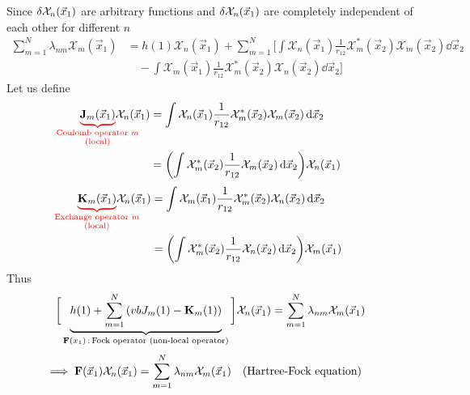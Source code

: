 \documentclass[12pt,a4paper,titlepage]{article}
\newcommand{\trm}[1]{\textrm{#1}} %
\newcommand{\Chi}{\mathcal{X}} %
\begin{document}
Since $\var{\Chi_{n}(\vec{x}_{1})}$ are arbitrary functions and $\var{\Chi_{n}(\vec{x}_{1})}$ are completely independent of each other for different $n$
\begin{equation}
\begin{aligned}
\sum_{m=1}^{N}\lambda_{nm}\Chi_{m}(\vec{x}_{1})&=h(1)\Chi_{n}(\vec{x}_{1})+\sum_{m=1}^{N}\bigg[\int\Chi_{n}(\vec{x}_{1})\frac{1}{r_{12}}\Chi_{m}^{*}(\vec{x}_{2})\Chi_{m}(\vec{x}_{2})\dd{\vec{x}_{2}}\\
&\quad-\int\Chi_{m}(\vec{x}_{1})\frac{1}{r_{12}}\Chi_{m}^{*}(\vec{x}_{2})\Chi_{n}(\vec{x}_{2})\dd{\vec{x}_{2}}\bigg]
\end{aligned}
\end{equation}
Let us define
\begin{equation}
\begin{aligned}
{\color{red}\underbrace{\color{black}\vb{J}_{m}(\vec{x}_{1})}_{\mathclap{\substack{\trm{Coulomb operator $m$}\\\trm{(local)}}}}}\Chi_{n}(\vec{x}_{1})&=\int\Chi_{n}(\vec{x}_{1})\frac{1}{r_{12}}\Chi_{m}^{*}(\vec{x}_{2})\Chi_{m}(\vec{x}_{2})\dd{\vec{x}_{2}}\\
&=\qty(\int\Chi_{m}^{*}(\vec{x}_{2})\frac{1}{r_{12}}\Chi_{m}(\vec{x}_{2})\dd{\vec{x}_{2}})\Chi_{n}(\vec{x}_{1})
\end{aligned}
\end{equation}
\begin{equation}
\begin{aligned}
{\color{red}\underbrace{\color{black}\vb{K}_{m}(\vec{x}_{1})}_{\mathclap{\substack{\trm{Exchange operator $m$}\\\trm{(local)}}}}}\Chi_{n}(\vec{x}_{1})&=\int\Chi_{m}(\vec{x}_{1})\frac{1}{r_{12}}\Chi_{m}^{*}(\vec{x}_{2})\Chi_{n}(\vec{x}_{2})\dd{\vec{x}_{2}}\\
&=\qty(\int\Chi_{m}^{*}(\vec{x}_{2})\frac{1}{r_{12}}\Chi_{n}(\vec{x}_{2})\dd{\vec{x}_{2}})\Chi_{m}(\vec{x}_{1})
\end{aligned}
\end{equation}
Thus
\begin{equation}
\bigg[\underbrace{h(1)+\sum_{m=1}^{N}\qty(vb{J}_{m}(1)-\vb{K}_{m}(1))}_{\vb{F}(x_{1})\,:\,\trm{Fock operator (non-local operator)}}\bigg]\Chi_{n}(\vec{x}_{1})=\sum_{m=1}^{N}\lambda_{nm}\Chi_{m}(\vec{x}_{1})
\end{equation}
\begin{equation}
\implies \vb{F}(\vec{x}_{1})\Chi_{n}(\vec{x}_{1})=\sum_{m=1}^{N}\lambda_{nm}\Chi_{m}(\vec{x}_{1})\qq{(Hartree-Fock equation)}
\end{equation}
\end{document}

